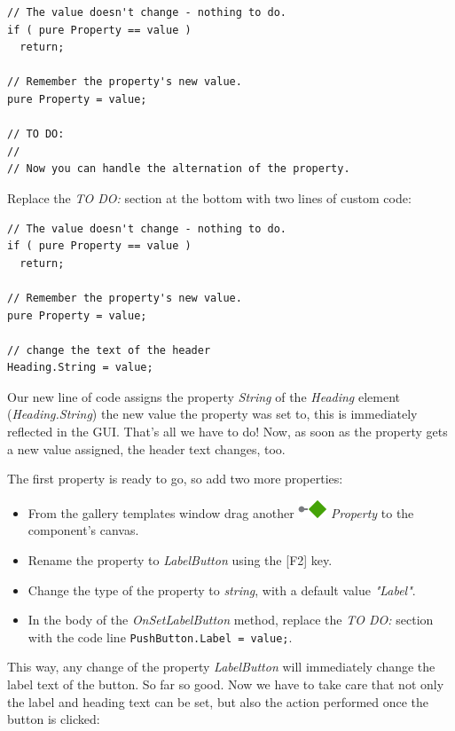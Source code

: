 \documentclass[
  a4paper,
,tablecaptionabove
]{scrbook}
\begin{document}
\begin{verbatim}
// The value doesn't change - nothing to do.
if ( pure Property == value )
  return;

// Remember the property's new value.
pure Property = value;

// TO DO:
//
// Now you can handle the alternation of the property.
\end{verbatim}

Replace the \emph{TO DO:} section at the bottom with two lines of custom
code:

\begin{verbatim}
// The value doesn't change - nothing to do.
if ( pure Property == value )
  return;

// Remember the property's new value.
pure Property = value;

// change the text of the header
Heading.String = value;
\end{verbatim}

Our new line of code assigns the property \emph{String} of the
\emph{Heading} element (\emph{Heading.String}) the new value the
property was set to, this is immediately reflected in the GUI. That's
all we have to do! Now, as soon as the property gets a new value
assigned, the header text changes, too.

The first property is ready to go, so add two more properties:

\begin{itemize}
\item
  From the gallery templates window drag another
  \includegraphics{./../asciidoc/modules/ROOT/assets/images/icons/PropertyIcon.png}
  \emph{Property} to the component's canvas.
\item
  Rename the property to \emph{LabelButton} using the {[}F2{]} key.
\item
  Change the type of the property to \emph{string}, with a default value
  \emph{"Label"}.
\item
  In the body of the \emph{OnSetLabelButton} method, replace the
  \emph{TO DO:} section with the code line
  \texttt{PushButton.Label\ =\ value;}.
\end{itemize}

This way, any change of the property \emph{LabelButton} will immediately
change the label text of the button. So far so good. Now we have to take
care that not only the label and heading text can be set, but also the
action performed once the button is clicked:
\end{document}
